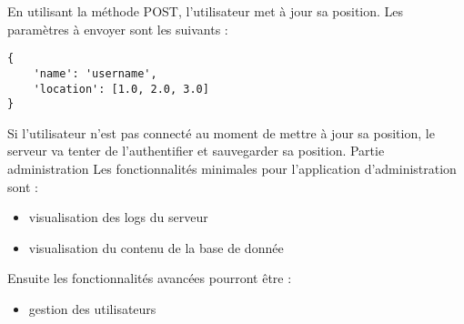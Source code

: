 En utilisant la méthode POST, l'utilisateur met à jour sa position. Les paramètres à envoyer sont les suivants :

\lstset{language=Javascript}
\begin{lstlisting}[caption=Corps de la requête where POST]
{
    'name': 'username',
    'location': [1.0, 2.0, 3.0]
}
\end{lstlisting}

Si l'utilisateur n'est pas connecté au moment de mettre à jour sa position, le serveur va tenter de l'authentifier et sauvegarder sa position.
Partie administration
Les fonctionnalités minimales pour l'application d'administration sont :
\begin{itemize}
    \item visualisation des logs du serveur
    \item visualisation du contenu de la base de donnée
\end{itemize}

Ensuite les fonctionnalités avancées pourront être :
\begin{itemize}
    \item gestion des utilisateurs
\end{itemize}

